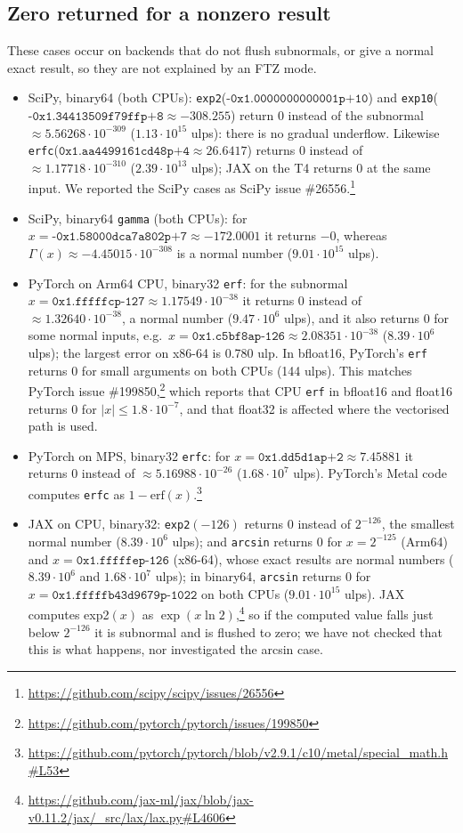 \documentclass[11pt,a4paper]{article}
\begin{document}
\subsection{Zero returned for a nonzero result}
These cases occur on backends that do not flush subnormals, or give a normal exact result, so they are not explained by an FTZ mode.
\begin{itemize}
\item SciPy, binary64 (both CPUs): \texttt{exp2}($\texttt{-0x1.0000000000001p+10}$) and \texttt{exp10}($\texttt{-0x1.34413509f79ffp+8}\approx -308.255$) return 0 instead of the subnormal $\approx 5.56268\cdot10^{-309}$ ($1.13\cdot10^{15}$ ulps): there is no gradual underflow. Likewise \texttt{erfc}($\texttt{0x1.aa4499161cd48p+4}\approx 26.6417$) returns 0 instead of $\approx 1.17718\cdot10^{-310}$ ($2.39\cdot10^{13}$ ulps); JAX on the T4 returns 0 at the same input. We reported the SciPy cases as SciPy issue \#26556.\footnote{\url{https://github.com/scipy/scipy/issues/26556}}
\item SciPy, binary64 \texttt{gamma} (both CPUs): for $x=\texttt{-0x1.58000dca7a802p+7}\approx -172.0001$ it returns $-0$, whereas $\Gamma(x)\approx -4.45015\cdot10^{-308}$ is a normal number ($9.01\cdot10^{15}$ ulps).
\item PyTorch on Arm64 CPU, binary32 \texttt{erf}: for the subnormal $x=\texttt{0x1.fffffcp-127}\approx 1.17549\cdot10^{-38}$ it returns 0 instead of $\approx 1.32640\cdot10^{-38}$, a normal number ($9.47\cdot10^6$ ulps), and it also returns 0 for some normal inputs, e.g.\ $x=\texttt{0x1.c5bf8ap-126}\approx 2.08351\cdot10^{-38}$ ($8.39\cdot10^6$ ulps); the largest error on x86-64 is 0.780 ulp. In bfloat16, PyTorch's \texttt{erf} returns 0 for small arguments on both CPUs (144 ulps). This matches PyTorch issue \#199850,\footnote{\url{https://github.com/pytorch/pytorch/issues/199850}} which reports that CPU \texttt{erf} in bfloat16 and float16 returns 0 for $|x|\le 1.8\cdot10^{-7}$, and that float32 is affected where the vectorised path is used.
\item PyTorch on MPS, binary32 \texttt{erfc}: for $x=\texttt{0x1.dd5d1ap+2}\approx 7.45881$ it returns 0 instead of $\approx 5.16988\cdot10^{-26}$ ($1.68\cdot10^7$ ulps). PyTorch's Metal code computes \texttt{erfc} as $1-\mathrm{erf}(x)$.\footnote{\url{https://github.com/pytorch/pytorch/blob/v2.9.1/c10/metal/special_math.h\#L53}}
\item JAX on CPU, binary32: \texttt{exp2}$(-126)$ returns 0 instead of $2^{-126}$, the smallest normal number ($8.39\cdot10^6$ ulps); and \texttt{arcsin} returns 0 for $x=2^{-125}$ (Arm64) and $x=\texttt{0x1.fffffep-126}$ (x86-64), whose exact results are normal numbers ($8.39\cdot10^6$ and $1.68\cdot10^7$ ulps); in binary64, \texttt{arcsin} returns 0 for $x=\texttt{0x1.fffffb43d9679p-1022}$ on both CPUs ($9.01\cdot10^{15}$ ulps). JAX computes exp2$(x)$ as $\exp(x\ln 2)$,\footnote{\url{https://github.com/jax-ml/jax/blob/jax-v0.11.2/jax/_src/lax/lax.py\#L4606}} so if the computed value falls just below $2^{-126}$ it is subnormal and is flushed to zero; we have not checked that this is what happens, nor investigated the arcsin case.
\end{itemize}
\end{document}
